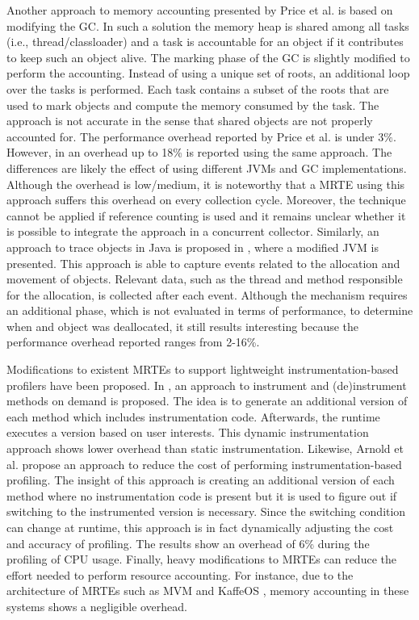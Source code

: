 Another approach to memory accounting presented by Price et al. \cite{Price:2003:GCM:829515.830545} is based on modifying the GC.
In such a solution the memory heap is shared among all tasks (i.e., thread/classloader) and a task is accountable for an object if it contributes to keep such an object alive.
The marking phase of the GC is slightly modified to perform the accounting.
Instead of using a unique set of roots, an additional loop over the tasks is performed.
Each task contains a subset of the roots that are used to mark objects and compute the memory consumed by the task.
The approach is not accurate in the sense that shared objects are not properly accounted for.
The performance overhead reported by Price et al. \cite{Price:2003:GCM:829515.830545} is under 3$\%$.
However, in \cite{dsn/09/geoffray/ijvm} an overhead up to 18\% is reported using the same approach.
The differences are likely the effect of using different JVMs and GC implementations.
Although the overhead is low/medium, it is noteworthy that a MRTE using this approach suffers this overhead on every collection cycle.
Moreover, the technique cannot be applied if reference counting is used and it remains unclear whether it is possible to integrate the approach in a concurrent collector.
Similarly, an approach to trace objects in Java is proposed in \cite{Lengauer:2015:AEO:2668930.2688037}, where a modified JVM is presented.
This approach is able to capture events related to the allocation and movement of objects.
Relevant data, such as the thread and method responsible for the allocation, is collected after each event.
Although the mechanism requires an additional phase, which is not evaluated in terms of performance, to determine when and object was deallocated, it still results interesting because the performance overhead reported ranges from 2-16\%.

Modifications to existent MRTEs to support lightweight instrumentation-based profilers have been proposed.
In \cite{Dmitriev:2004:PJA:974043.974067}, an approach to instrument and (de)instrument methods on demand is proposed.
The idea is to generate an additional version of each method which includes instrumentation code.
Afterwards, the runtime executes a version based on user interests.
This dynamic instrumentation approach shows lower overhead than static instrumentation.
Likewise, Arnold et al. \cite{citeulike:481405} propose an approach to reduce the cost of performing instrumentation-based profiling.
The insight of this approach is creating an additional version of each method where no instrumentation code is present but it is used to figure out if switching to the instrumented version is necessary.
Since the switching condition can change at runtime, this approach is in fact dynamically adjusting the cost and accuracy of profiling.
The results show an overhead of 6\% during the profiling of CPU usage.
Finally, heavy modifications to MRTEs can reduce the effort needed to perform resource accounting.
For instance, due to the architecture of MRTEs such as MVM \cite{czajkowski_multitasking_2001} and KaffeOS \cite{back_processes_2000}, memory accounting in these systems shows a negligible overhead.

